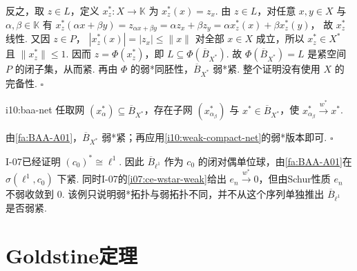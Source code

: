\begin{FAProof}
反之，取 \(\displaystyle z\in L\)，定义 \(\displaystyle x_z^*:X\to\mathbb K\) 为
\(\displaystyle x_z^*(x)=z_x\).
由 \(\displaystyle z\in L\)，对任意 \(\displaystyle x,y\in X\) 与 \(\displaystyle \alpha,\beta\in\mathbb K\) 有
\(\displaystyle x_z^*(\alpha x+\beta y) =z_{\alpha x+\beta y} =\alpha z_x+\beta z_y =\alpha x_z^*(x)+\beta x_z^*(y)\)，
故 \(\displaystyle x_z^*\) 线性. 又因 \(\displaystyle z\in P\)，
\(\displaystyle |x_z^*(x)|=|z_x|\leqslant\|x\|\)
对全部 \(\displaystyle x\in X\) 成立，所以 \(\displaystyle x_z^*\in X^*\) 且 \(\displaystyle \|x_z^*\|\leqslant1\). 因而 \(\displaystyle z=\Phi(x_z^*)\)，即 \(\displaystyle L\subseteq\Phi(\overline B_{X^*})\). 故
\(\displaystyle \Phi(\overline B_{X^*})=L\)
是紧空间 \(\displaystyle P\) 的闭子集，从而紧. 再由 \(\displaystyle \Phi\) 的弱*同胚性，\(\displaystyle \overline B_{X^*}\) 弱*紧. 整个证明没有使用 \(\displaystyle X\) 的完备性.
\hfill\(\square\)
\end{FAProof}

\begin{FACorollary}{i10:baa-net}
任取网 \(\displaystyle (x_\alpha^*)\subseteq\overline B_{X^*}\)，存在子网 \(\displaystyle (x_{\alpha_\beta}^*)\) 与 \(\displaystyle x^*\in\overline B_{X^*}\)，使
\(\displaystyle x_{\alpha_\beta}^*\overset{w^*}{\longrightarrow}x^*\).
\end{FACorollary}

\begin{FAProof}
由\autoref{fa:BAA-A01}，\(\displaystyle \overline B_{X^*}\) 弱*紧；再应用\autoref{i10:weak-compact-net}的弱*版本即可.
\hfill\(\square\)
\end{FAProof}

\begin{FACounterexample}[同一集合上的两种拓扑]
I-07已经证明 \(\displaystyle (c_0)^*\cong\ell^1\). 因此 \(\displaystyle \overline B_{\ell^1}\) 作为 \(\displaystyle c_0\) 的闭对偶单位球，由\autoref{fa:BAA-A01}在 \(\displaystyle \sigma(\ell^1,c_0)\) 下紧. 同时I-07的\autoref{i07:ce-wstar-weak}给出 \(\displaystyle e_n\overset{w^*}{\longrightarrow}0\)，但由Schur性质 \(\displaystyle e_n\) 不弱收敛到 \(\displaystyle0\). 该例只说明弱*拓扑与弱拓扑不同，并不从这个序列单独推出 \(\displaystyle \overline B_{\ell^1}\) 是否弱紧.
\end{FACounterexample}

\section{Goldstine定理}\label{sec:i10-goldstine}

